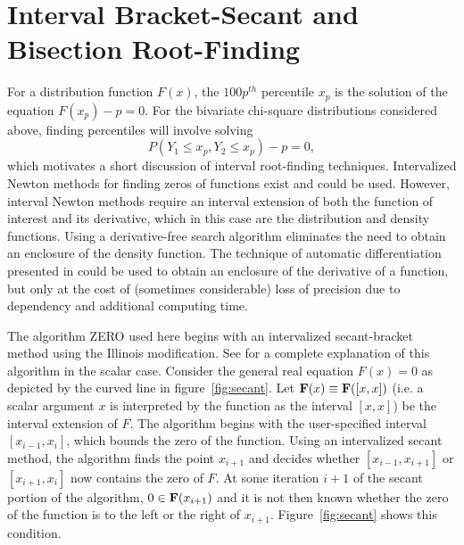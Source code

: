 \section{Interval Bracket-Secant and Bisection Root-Finding}

For a distribution function $F(x)$, the $100p^{th}$ percentile $x_p$ is the
solution of the equation 
$F(x_p) - p = 0$.  For the bivariate chi-square distributions
considered above, finding percentiles will involve solving 
$$P(Y_1 \leq x_p, Y_2 \leq x_p) - p = 0,$$
which motivates a short discussion of interval root-finding techniques.
Intervalized Newton methods for finding zeros of functions 
exist and could be used.
However, interval Newton methods require 
an interval extension of both the function of interest
and its derivative, which in this
case are the distribution and density functions.  
Using a derivative-free search algorithm
eliminates the need to obtain an enclosure of the density function.
The technique of automatic differentiation presented in 
\cite{Moore79} could be used to obtain an
enclosure of the derivative of a function, but only at the cost of (sometimes
considerable) loss of precision due to dependency and additional computing
time. 


The algorithm ZERO used here
begins with an intervalized secant-bracket method using the Illinois
modification.  See \cite{Thisted} for a complete explanation of this
algorithm in the scalar case.   
Consider the general real equation $F(x) = 0$ as depicted by the curved line
in figure~\ref{fig:secant}.  Let ${\bf F}(x) \equiv 
{\bf F}([x,x])$ (i.e. a scalar argument $x$ is interpreted by the function
as the interval $[x,x]$) be the interval extension of $F$.
The algorithm begins with the user-specified
interval $[x_{i-1},x_i]$, which bounds the zero
of the function.  Using an intervalized secant method, the algorithm finds the
point $x_{i+1}$ and decides whether  
$[x_{i-1},x_{i+1}]$ or $[x_{i+1},x_i]$ now contains the zero of $F$.
At some iteration $i+1$ of the secant portion of the algorithm,
$0 \in {\bf F}(x_{i+1})$
and it is not then known whether the zero of the function
is to the left
or the right of $x_{i+1}$.   Figure~\ref{fig:secant} shows this condition.

